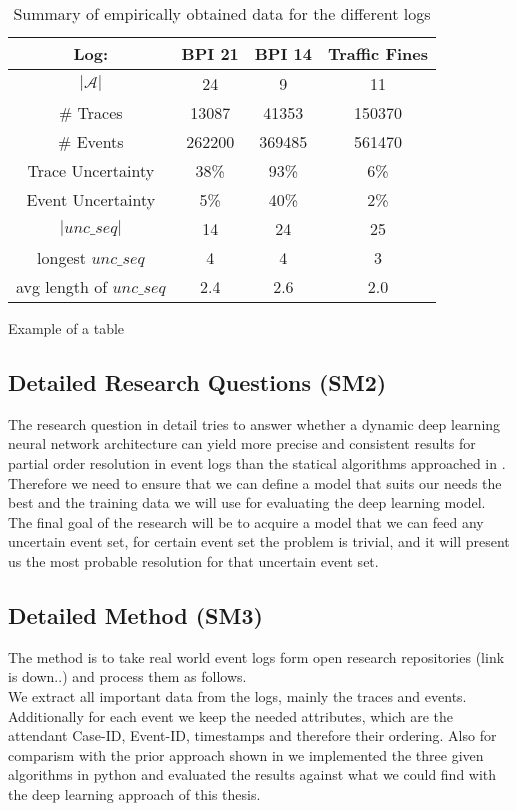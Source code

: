 \documentclass[
	a4paper,
	pagesize,
	pdftex,
	12pt,
	ngerman,
	fleqn,
	final,
	]{scrartcl}
\theoremstyle{plain}
\theoremstyle{definition}
\begin{document}
	\begin{table}[h!]
		\centering
		\begin{tabular}{| c | c | c | c |}
			\hline
			Log:                     & BPI 21 & BPI 14 & Traffic Fines \\
			\hline \hline
			$| \mathcal{A} |$        & 24     & 9      & 11 \\
			\# Traces                & 13087  & 41353  & 150370 \\
			\# Events                & 262200 & 369485 & 561470 \\
			Trace Uncertainty        & 38\%   & 93\%   & 6\% \\  
			Event Uncertainty        & 5\%    & 40\%   & 2\% \\
			$|unc\_seq|$             & 14     & 24     & 25 \\
			longest $unc\_seq$       & 4      & 4      & 3 \\
			avg length of $unc\_seq$ & 2.4    & 2.6    & 2.0 \\
			\hline
		\end{tabular}
		\caption{Summary of empirically obtained data for the different logs}
		\label{table:statistics}
	\end{table}
	
	Example of a table
	
	
	\subsection{Detailed Research Questions (SM2)}
	The research question in detail tries to answer whether a dynamic deep learning neural network architecture can yield more precise and consistent results for partial order resolution in event logs than the statical algorithms approached in \cite{self}. \\
	Therefore we need to ensure that we can define a model that suits our needs the best and the training data we will use for evaluating the deep learning model. The final goal of the research will be to acquire a model that we can feed any uncertain event set, for certain event set the problem is trivial, and it will present us the most probable resolution for that uncertain event set. 
	
	\subsection{Detailed Method (SM3)}
	The method is to take real world event logs form open research repositories (link is down..) and process them as follows. \\
	We extract all important data from the logs, mainly the traces and events. Additionally for each event we keep the needed attributes, which are the attendant Case-ID, Event-ID, timestamps and therefore their ordering. 
	Also for comparism with the prior approach shown in \cite{self} we implemented the three given algorithms in python and evaluated the results against what we could find with the deep learning approach of this thesis. 
\end{document}
